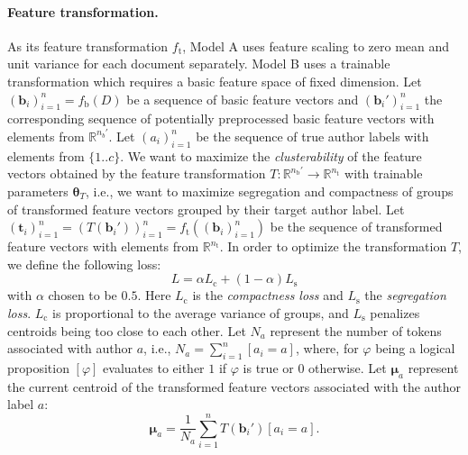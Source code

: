 \documentclass[10pt, a4paper]{article}
\newcommand{\vect}[1]{\bm{#1}}
\begin{document}
\paragraph{Feature transformation.}
As its feature transformation $f_\mathrm{t}$, Model A uses feature scaling to zero mean and unit variance for each document separately. Model B uses a trainable transformation which requires a basic feature space of fixed dimension. Let $(\vect{b}_i)_{i=1}^n = f_\mathrm{b}(D)$ be a sequence of basic feature vectors and $(\vect{b}_i')_{i=1}^n$ the corresponding sequence of potentially preprocessed basic feature vectors with elements from $\mathbb{R}^{n_{b}'}$. Let $(a_i)_{i=1}^n$ be the sequence of true author labels with elements from $\{1..c\}$. We want to maximize the \emph{clusterability} of the feature vectors obtained by the feature transformation $T:\mathbb{R}^{n_\mathrm{b}'}\rightarrow\mathbb{R}^{n_\mathrm{t}}$ with trainable parameters $\vect{\theta}_T$, i.e., we want to maximize segregation and compactness of groups of transformed feature vectors grouped by their target author label. Let $(\vect{t}_i)_{i=1}^n = (T(\boldsymbol{b}_i'))_{i=1}^n = f_\mathrm{t}((\vect{b}_i)_{i=1}^n)$ be the sequence of transformed feature vectors with elements from $\mathbb{R}^{n_\mathrm{t}}$. In order to optimize the transformation $T$, we define the following loss:
\begin{equation}
	L = \alpha L_\mathrm{c} + (1-\alpha)L_\mathrm{s}
\end{equation}
with $\alpha$ chosen to be $0.5$. Here $L_\mathrm{c}$ is the \emph{compactness loss} and $L_\mathrm{s}$ the \emph{segregation loss}. $L_\mathrm{c}$ is proportional to the average variance of groups, and $L_\mathrm{s}$ penalizes centroids being too close to each other. Let $N_a$ represent the number of tokens associated with author $a$, i.e., $N_a = \sum_{i=1}^n[a_i=a]$, where, for $\varphi$ being a logical proposition $[\varphi]$ evaluates to either $1$ if $\varphi$ is true or $0$ otherwise.
Let $\vect{\mu}_a$ represent the current centroid of the transformed feature vectors associated with the author label $a$:
\begin{equation}
\vect{\mu}_a = \frac{1}{N_a}\sum_{i=1}^n T(\vect{b}_i')[a_i=a].
\end{equation}	
\end{document}

